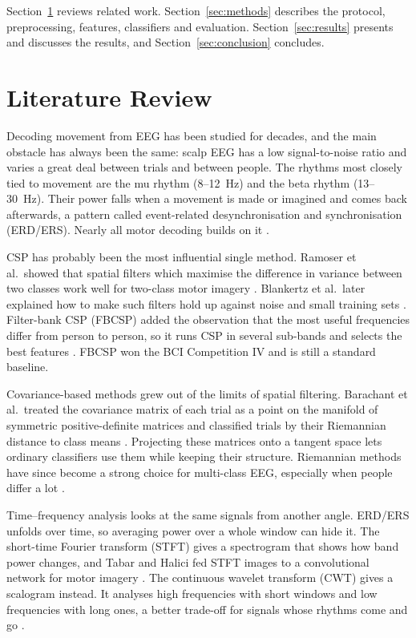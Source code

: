 \documentclass[pdflatex,sn-mathphys-num]{sn-jnl}%
\theoremstyle{thmstyleone}%
\theoremstyle{thmstyletwo}%
\theoremstyle{thmstylethree}%
\begin{document}
Section~\ref{sec:related} reviews related work. Section~\ref{sec:methods} describes the protocol, preprocessing, features, classifiers and evaluation. Section~\ref{sec:results} presents and discusses the results, and Section~\ref{sec:conclusion} concludes.

\FloatBarrier
\section{Literature Review}\label{sec:related}

Decoding movement from EEG has been studied for decades, and the main obstacle has always been the same: scalp EEG has a low signal-to-noise ratio and varies a great deal between trials and between people. The rhythms most closely tied to movement are the mu rhythm (8--12~Hz) and the beta rhythm (13--30~Hz). Their power falls when a movement is made or imagined and comes back afterwards, a pattern called event-related desynchronisation and synchronisation (ERD/ERS). Nearly all motor decoding builds on it \citep{PfurtschellerAranibar1977,PfurtschellerLopes1999}.

CSP has probably been the most influential single method. Ramoser et al.\ showed that spatial filters which maximise the difference in variance between two classes work well for two-class motor imagery \citep{Ramoser2000}. Blankertz et al.\ later explained how to make such filters hold up against noise and small training sets \citep{Blankertz2008}. Filter-bank CSP (FBCSP) added the observation that the most useful frequencies differ from person to person, so it runs CSP in several sub-bands and selects the best features \citep{Ang2012}. FBCSP won the BCI Competition IV and is still a standard baseline.

Covariance-based methods grew out of the limits of spatial filtering. Barachant et al.\ treated the covariance matrix of each trial as a point on the manifold of symmetric positive-definite matrices and classified trials by their Riemannian distance to class means \citep{Barachant2012}. Projecting these matrices onto a tangent space lets ordinary classifiers use them while keeping their structure. Riemannian methods have since become a strong choice for multi-class EEG, especially when people differ a lot \citep{Congedo2017}.

Time--frequency analysis looks at the same signals from another angle. ERD/ERS unfolds over time, so averaging power over a whole window can hide it. The short-time Fourier transform (STFT) gives a spectrogram that shows how band power changes, and Tabar and Halici fed STFT images to a convolutional network for motor imagery \citep{Tabar2017}. The continuous wavelet transform (CWT) gives a scalogram instead. It analyses high frequencies with short windows and low frequencies with long ones, a better trade-off for signals whose rhythms come and go \citep{Torrence1998}.
\end{document}
